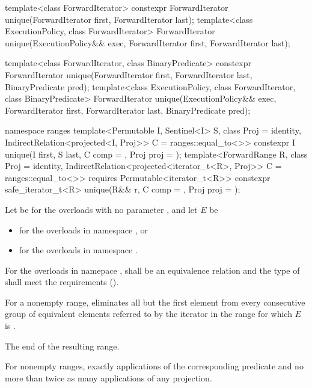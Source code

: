 %
\begin{itemdecl}
template<class ForwardIterator>
  constexpr ForwardIterator unique(ForwardIterator first, ForwardIterator last);
template<class ExecutionPolicy, class ForwardIterator>
  ForwardIterator unique(ExecutionPolicy&& exec,
                         ForwardIterator first, ForwardIterator last);

template<class ForwardIterator, class BinaryPredicate>
  constexpr ForwardIterator unique(ForwardIterator first, ForwardIterator last,
                                   BinaryPredicate pred);
template<class ExecutionPolicy, class ForwardIterator, class BinaryPredicate>
  ForwardIterator unique(ExecutionPolicy&& exec,
                         ForwardIterator first, ForwardIterator last,
                         BinaryPredicate pred);

namespace ranges {
  template<Permutable I, Sentinel<I> S, class Proj = identity,
           IndirectRelation<projected<I, Proj>> C = ranges::equal_to<>>
    constexpr I unique(I first, S last, C comp = {}, Proj proj = {});
  template<ForwardRange R, class Proj = identity,
           IndirectRelation<projected<iterator_t<R>, Proj>> C = ranges::equal_to<>>
    requires Permutable<iterator_t<R>>
    constexpr safe_iterator_t<R>
      unique(R&& r, C comp = {}, Proj proj = {});
}
\end{itemdecl}

\begin{itemdescr}
\pnum
Let  be 
for the overloads with no parameter , and
let $E$ be
\begin{itemize}
\setlength{\emergencystretch}{1em}
\item
  for the overloads in namespace , or
\item
  for the overloads in namespace .
\end{itemize}

\pnum
\requires
For the overloads in namepace ,
 shall be an equivalence relation and
the type of  shall meet
the  requirements ().

\pnum
\effects
For a nonempty range, eliminates all but the first element
from every consecutive group of equivalent elements referred to
by the iterator  in the range 
for which $E$ is .

\pnum
\returns
The end of the resulting range.

\pnum
\complexity
For nonempty ranges, exactly  applications
of the corresponding predicate and
no more than twice as many applications of any projection.
\end{itemdescr}

